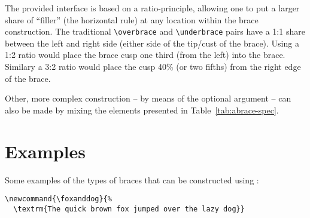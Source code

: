 \documentclass{ltxdockit}[2011/03/25]
\begin{document}
The provided interface is based on a ratio-principle, allowing one to put a larger share of ``filler'' (the horizontal rule) at any location within the brace construction. The traditional \lstinline!\overbrace! and \lstinline!\underbrace! pairs have a \mbox{1:1} share between the left and right side (either side of the tip/cust of the brace). Using a \mbox{1:2} ratio would place the brace cusp one third (from the left) into the brace. Similary a \mbox{3:2} ratio would place the cusp 40\% (or two fifths) from the right edge of the brace.

Other, more complex construction -- by means of the optional  argument -- can also be made by mixing the elements presented in Table~\ref{tab:abrace-spec}.

\section{Examples}

Some examples of the types of braces that can be constructed using :

\begin{lstlisting}
\newcommand{\foxanddog}{%
  \textrm{The quick brown fox jumped over the lazy dog}}
\end{lstlisting}
\end{document}
